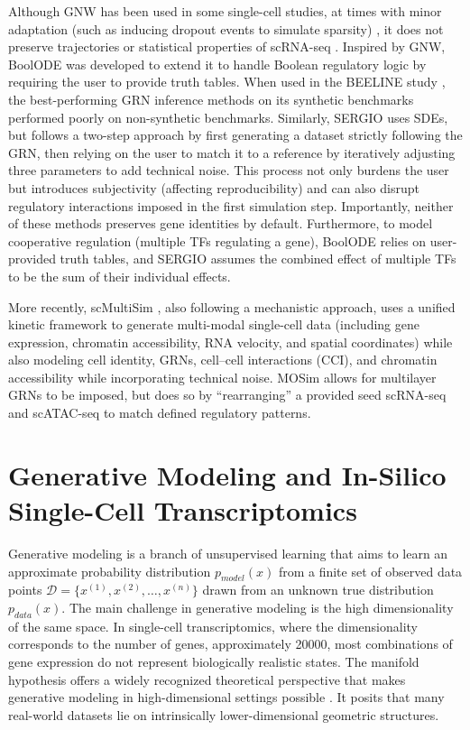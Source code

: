 Although GNW has been used in some single-cell studies, at times with minor adaptation (such as inducing dropout events to simulate sparsity) \cite{chan2017gene, chen2018evaluating}, it does not preserve trajectories or statistical properties of scRNA-seq \cite{chen2018evaluating}. Inspired by GNW, BoolODE \cite{pratapa2020benchmarking} was developed to extend it to handle Boolean regulatory logic by requiring the user to provide truth tables. When used in the BEELINE study \cite{pratapa2020benchmarking}, the best-performing GRN inference methods on its synthetic benchmarks performed poorly on non-synthetic benchmarks. Similarly, SERGIO \cite{dibaeinia2020sergio} uses SDEs, but follows a two-step approach by first generating a dataset strictly following the GRN, then relying on the user to match it to a reference by iteratively adjusting three parameters to add technical noise. This process not only burdens the user but introduces subjectivity (affecting reproducibility) and can also disrupt regulatory interactions imposed in the first simulation step. Importantly, neither of these methods preserves gene identities by default. Furthermore, to model cooperative regulation (multiple TFs regulating a gene), BoolODE relies on user-provided truth tables, and SERGIO assumes the combined effect of multiple TFs to be the sum of their individual effects. 

More recently, scMultiSim \cite{li2025scmultisim}, also following a mechanistic approach, uses a unified kinetic framework to generate multi-modal single-cell data (including gene expression, chromatin accessibility, RNA velocity, and spatial coordinates) while also modeling cell identity, GRNs, cell–cell interactions (CCI), and chromatin accessibility while incorporating technical noise. MOSim \cite{monzo2025mosim} allows for multilayer GRNs to be imposed, but does so by  “rearranging” a provided seed scRNA-seq and scATAC-seq to match defined regulatory patterns. 

\section*{Generative Modeling and In-Silico Single-Cell Transcriptomics}

Generative modeling is a branch of unsupervised learning that aims to learn an approximate probability distribution $p_{model}(x)$ from a finite set of observed data points $\mathcal{D} = \{x^{(1)}, x^{(2)}, \dots, x^{(n)}\}$ drawn from an unknown true distribution $p_{data}(x)$. The main challenge in generative modeling is the high dimensionality of the same space. In single-cell transcriptomics, where the dimensionality corresponds to the number of genes, approximately 20000, most combinations of gene expression do not represent biologically realistic states. The manifold hypothesis offers a widely recognized theoretical perspective that makes generative modeling in high-dimensional settings possible \cite{fefferman2016testing}. It posits that many real-world datasets lie on intrinsically lower-dimensional geometric structures.


